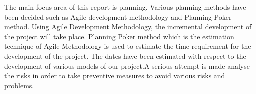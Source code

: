 The main focus area of this report is planning. Various planning methods have been decided such as Agile development methodology and Planning Poker method.
Using Agile Development Methodology, the incremental  development of the project will take place. Planning Poker method  which is the estimation technique of Agile Methodology is used to estimate the time requirement for the development of the project. The dates have been estimated with respect to the development of various models of our project.A serious attempt is made analyse the risks  in order to take preventive measures to avoid various risks and problems. 